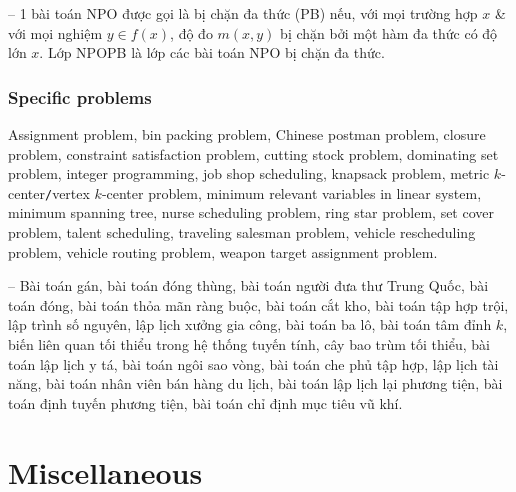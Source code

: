 \documentclass{article}
\begin{document}
-- 1 bài toán NPO được gọi là bị chặn đa thức (PB) nếu, với mọi trường hợp $x$ \& với mọi nghiệm $y\in f(x)$, độ đo $m(x,y)$ bị chặn bởi một hàm đa thức có độ lớn $x$. Lớp NPOPB là lớp các bài toán NPO bị chặn đa thức.


\subsubsection{Specific problems}
Assignment problem, bin packing problem, Chinese postman problem, closure problem, constraint satisfaction problem, cutting stock problem, dominating set problem, integer programming, job shop scheduling, knapsack problem, metric $k$-center{\tt/}vertex $k$-center problem, minimum relevant variables in linear system, minimum spanning tree, nurse scheduling problem, ring star problem, set cover problem, talent scheduling, traveling salesman problem, vehicle rescheduling problem, vehicle routing problem, weapon target assignment problem.

-- Bài toán gán, bài toán đóng thùng, bài toán người đưa thư Trung Quốc, bài toán đóng, bài toán thỏa mãn ràng buộc, bài toán cắt kho, bài toán tập hợp trội, lập trình số nguyên, lập lịch xưởng gia công, bài toán ba lô, bài toán tâm đỉnh $k$, biến liên quan tối thiểu trong hệ thống tuyến tính, cây bao trùm tối thiểu, bài toán lập lịch y tá, bài toán ngôi sao vòng, bài toán che phủ tập hợp, lập lịch tài năng, bài toán nhân viên bán hàng du lịch, bài toán lập lịch lại phương tiện, bài toán định tuyến phương tiện, bài toán chỉ định mục tiêu vũ khí.


\section{Miscellaneous}


\printbibliography[heading=bibintoc]
\end{document}
